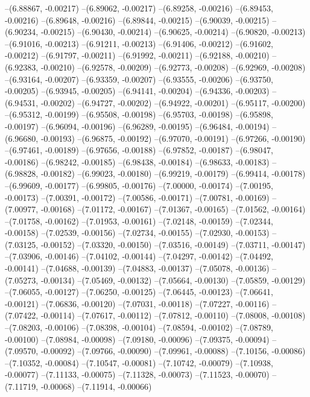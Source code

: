 --(6.88867, -0.00217)
--(6.89062, -0.00217)
--(6.89258, -0.00216)
--(6.89453, -0.00216)
--(6.89648, -0.00216)
--(6.89844, -0.00215)
--(6.90039, -0.00215)
--(6.90234, -0.00215)
--(6.90430, -0.00214)
--(6.90625, -0.00214)
--(6.90820, -0.00213)
--(6.91016, -0.00213)
--(6.91211, -0.00213)
--(6.91406, -0.00212)
--(6.91602, -0.00212)
--(6.91797, -0.00211)
--(6.91992, -0.00211)
--(6.92188, -0.00210)
--(6.92383, -0.00210)
--(6.92578, -0.00209)
--(6.92773, -0.00208)
--(6.92969, -0.00208)
--(6.93164, -0.00207)
--(6.93359, -0.00207)
--(6.93555, -0.00206)
--(6.93750, -0.00205)
--(6.93945, -0.00205)
--(6.94141, -0.00204)
--(6.94336, -0.00203)
--(6.94531, -0.00202)
--(6.94727, -0.00202)
--(6.94922, -0.00201)
--(6.95117, -0.00200)
--(6.95312, -0.00199)
--(6.95508, -0.00198)
--(6.95703, -0.00198)
--(6.95898, -0.00197)
--(6.96094, -0.00196)
--(6.96289, -0.00195)
--(6.96484, -0.00194)
--(6.96680, -0.00193)
--(6.96875, -0.00192)
--(6.97070, -0.00191)
--(6.97266, -0.00190)
--(6.97461, -0.00189)
--(6.97656, -0.00188)
--(6.97852, -0.00187)
--(6.98047, -0.00186)
--(6.98242, -0.00185)
--(6.98438, -0.00184)
--(6.98633, -0.00183)
--(6.98828, -0.00182)
--(6.99023, -0.00180)
--(6.99219, -0.00179)
--(6.99414, -0.00178)
--(6.99609, -0.00177)
--(6.99805, -0.00176)
--(7.00000, -0.00174)
--(7.00195, -0.00173)
--(7.00391, -0.00172)
--(7.00586, -0.00171)
--(7.00781, -0.00169)
--(7.00977, -0.00168)
--(7.01172, -0.00167)
--(7.01367, -0.00165)
--(7.01562, -0.00164)
--(7.01758, -0.00162)
--(7.01953, -0.00161)
--(7.02148, -0.00159)
--(7.02344, -0.00158)
--(7.02539, -0.00156)
--(7.02734, -0.00155)
--(7.02930, -0.00153)
--(7.03125, -0.00152)
--(7.03320, -0.00150)
--(7.03516, -0.00149)
--(7.03711, -0.00147)
--(7.03906, -0.00146)
--(7.04102, -0.00144)
--(7.04297, -0.00142)
--(7.04492, -0.00141)
--(7.04688, -0.00139)
--(7.04883, -0.00137)
--(7.05078, -0.00136)
--(7.05273, -0.00134)
--(7.05469, -0.00132)
--(7.05664, -0.00130)
--(7.05859, -0.00129)
--(7.06055, -0.00127)
--(7.06250, -0.00125)
--(7.06445, -0.00123)
--(7.06641, -0.00121)
--(7.06836, -0.00120)
--(7.07031, -0.00118)
--(7.07227, -0.00116)
--(7.07422, -0.00114)
--(7.07617, -0.00112)
--(7.07812, -0.00110)
--(7.08008, -0.00108)
--(7.08203, -0.00106)
--(7.08398, -0.00104)
--(7.08594, -0.00102)
--(7.08789, -0.00100)
--(7.08984, -0.00098)
--(7.09180, -0.00096)
--(7.09375, -0.00094)
--(7.09570, -0.00092)
--(7.09766, -0.00090)
--(7.09961, -0.00088)
--(7.10156, -0.00086)
--(7.10352, -0.00084)
--(7.10547, -0.00081)
--(7.10742, -0.00079)
--(7.10938, -0.00077)
--(7.11133, -0.00075)
--(7.11328, -0.00073)
--(7.11523, -0.00070)
--(7.11719, -0.00068)
--(7.11914, -0.00066)
